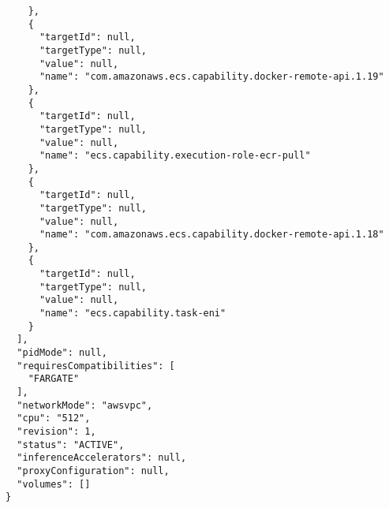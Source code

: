 \begin{verbatim}
    },
    {
      "targetId": null,
      "targetType": null,
      "value": null,
      "name": "com.amazonaws.ecs.capability.docker-remote-api.1.19"
    },
    {
      "targetId": null,
      "targetType": null,
      "value": null,
      "name": "ecs.capability.execution-role-ecr-pull"
    },
    {
      "targetId": null,
      "targetType": null,
      "value": null,
      "name": "com.amazonaws.ecs.capability.docker-remote-api.1.18"
    },
    {
      "targetId": null,
      "targetType": null,
      "value": null,
      "name": "ecs.capability.task-eni"
    }
  ],
  "pidMode": null,
  "requiresCompatibilities": [
    "FARGATE"
  ],
  "networkMode": "awsvpc",
  "cpu": "512",
  "revision": 1,
  "status": "ACTIVE",
  "inferenceAccelerators": null,
  "proxyConfiguration": null,
  "volumes": []
}
\end{verbatim}